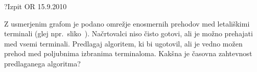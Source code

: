 \begin{naloga}{?}{Izpit OR 15.9.2010}
\begin{vprasanje}
Z usmerjenim grafom je podano omrežje enosmernih prehodov
med letališkimi terminali (glej npr.~sliko~).
Načrtovalci niso čisto gotovi, ali je možno prehajati med vsemi terminali.
Predlagaj algoritem, ki bi ugotovil,
ali je vedno možen prehod med poljubnima izbranima terminaloma.
Kakšna je časovna zahtevnost predlaganega algoritma?

\end{vprasanje}
\begin{odgovor}
\end{odgovor}
\end{naloga}
